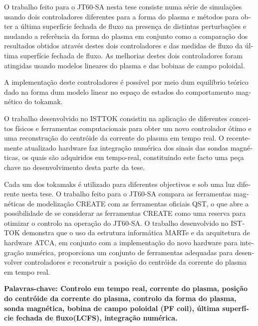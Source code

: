 \begin{otherlanguage}{portuguese}
O trabalho feito para o JT60-SA nesta tese consiste numa série de simulações usando dois controladores diferentes para a forma do plasma e métodos para obter a última superfície fechada de fluxo na presença de distintas perturbações e mudando a referência da forma do plasma  em conjunto como a comparação dos resultados obtidos através destes dois controladores e  das medidas de fluxo da última superfície fechada de fluxo.  As melhorias destes dois controladores foram atingidas usando modelos lineares  do plasma e das bobinas de campo poloidal.\smallskip

A implementação deste controladores é  possível por meio dum equilíbrio teórico dado na forma dum modelo linear no espaço de estados do comportamento magnético do tokamak. \smallskip


O trabalho desenvolvido no ISTTOK consistiu na aplicação de diferentes conceitos físicos e ferramentas computacionais para obter um novo controlador ótimo e uma reconstrução do centróide da corrente do plasma em tempo real. O recentemente atualizado hardware faz integração numérica dos sinais das sondas magnéticas, os quais são adquiridos em tempo-real, constituindo este facto uma peça chave no desenvolvimento desta parte da tese. \smallskip


Cada um dos tokamaks é utilizado para diferentes objectivos e sob uma luz diferente nesta tese. O trabalho feito para o JT60-SA compara as ferramentas magnéticas de modelização CREATE com as ferramentas oficiais QST, o que abre a possibilidade de se considerar as ferramentas CREATE como uma reserva para otimizar o controlo na operação do JT60-SA. O trabalho desenvolvido no ISTTOK demonstra que o uso da estrutura informática MARTe e da arquitetura de hardware ATCA, em conjunto com a implementação do novo hardware para integração numérica, proporciona um conjunto de ferramentas adequadas para desenvolver controladores e reconstruir a posição do centróide da corrente do plasma em tempo real. \smallskip


\vfill
\textbf{ Palavras-chave: Controlo em tempo real, corrente do plasma, posição do centróide da corrente do plasma,   controlo da forma do plasma, sonda magnética, bobina de campo poloidal (PF coil), última superfície fechada de fluxo(LCFS), integração numérica.    } 

\end{otherlanguage}
\pagebreak
